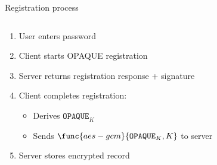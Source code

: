 \documentclass[aspectratio=169, lualatex, handout]{beamer}
\begin{document}
\begin{frame}{Registration process}
	\begin{columns}[c]
		\begin{column}{1\textwidth}
			\begin{enumerate}
				\item User enters password
				\item Client starts OPAQUE registration
				\item Server returns registration response + signature
				\item Client completes registration:
				      \begin{itemize}
					      \item Derives $\mathtt{OPAQUE}_K$
					      \item Sends $\func{aes-gcm}{\mathtt{OPAQUE}_K, K}$ to server
				      \end{itemize}
				\item Server stores encrypted record
			\end{enumerate}
		\end{column}
	\end{columns}
\end{frame}
\end{document}

